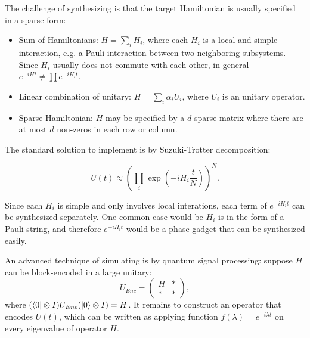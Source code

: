 \documentclass[a4paper,onecolumn,11pt,unpublished]{quantumarticle}
\begin{document}
The challenge of synthesizing is that the target Hamiltonian is usually specified in a sparse form:
\begin{itemize}
  \item Sum of Hamiltonians: $H=\sum_i H_i$, where each $H_i$ is a local and simple interaction, e.g. a Pauli interaction between two neighboring subsystems. Since $H_i$ usually does not commute with each other, in general $e^{-iHt}\neq \prod e^{-iH_it}$.
  \item Linear combination of unitary\cite{childsHamiltonianSimulationUsing2012}: $H=\sum_i \alpha_i U_i$, where $U_i$ is an unitary operator.
  \item Sparse Hamiltonian\cite{berryExponentialImprovementPrecision2014}: $H$ may be specified by a $d$-sparse matrix where there are at most $d$ non-zeros in each row or column.
\end{itemize}

The standard solution to implement is by Suzuki-Trotter decomposition\cite{hatanoFindingExponentialProduct2005}: 

\begin{equation}
  U(t)\approx\left(\prod_i \exp(-iH_i \frac{t}{N})\right)^N.
\end{equation}


Since each $H_i$ is simple and only involves local interations, each term of $e^{-iH_it}$ can be synthesized separately. One common case would be $H_i$ is in the form of a Pauli string, and therefore $e^{-iH_it}$ would be a phase gadget\cite{cowtanPhaseGadgetSynthesis2020} that can be synthesized easily.

An advanced technique of simulating is by quantum signal processing\cite{martynGrandUnificationQuantum2021,lowHamiltonianSimulationQubitization2019}: suppose $H$ can be block-encoded in a large unitary:
\begin{equation}
U_{Enc} = \left(\begin{array}{cc}
H&*\\
*&*  
\end{array}\right),
\end{equation}
where $(\bra{0}\otimes I)U_{Enc}(\ket{0}\otimes I) = H$. It remains to construct an operator that encodes $U(t)$, which can be written as applying function $f(\lambda) = e^{-i\lambda t}$ on every eigenvalue of operator $H$. 
\end{document}
